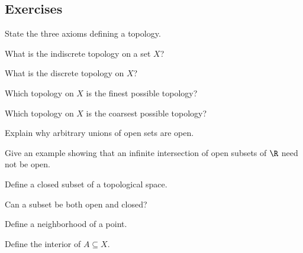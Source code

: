 \subsection{Exercises}
\label{subsec:point-set-topology-exercises}

\begin{exercise}[1]
State the three axioms defining a topology.
\end{exercise}

\begin{exercise}[1]
What is the indiscrete topology on a set \(X\)?
\end{exercise}

\begin{exercise}[1]
What is the discrete topology on \(X\)?
\end{exercise}

\begin{exercise}[1]
Which topology on \(X\) is the finest possible topology?
\end{exercise}

\begin{exercise}[1]
Which topology on \(X\) is the coarsest possible topology?
\end{exercise}

\begin{exercise}[1]
Explain why arbitrary unions of open sets are open.
\end{exercise}

\begin{exercise}[1]
Give an example showing that an infinite intersection of open subsets of
\(\R\) need not be open.
\end{exercise}

\begin{exercise}[1]
Define a closed subset of a topological space.
\end{exercise}

\begin{exercise}[1]
Can a subset be both open and closed?
\end{exercise}

\begin{exercise}[1]
Define a neighborhood of a point.
\end{exercise}

\begin{exercise}[1]
Define the interior of \(A\subseteq X\).
\end{exercise}

